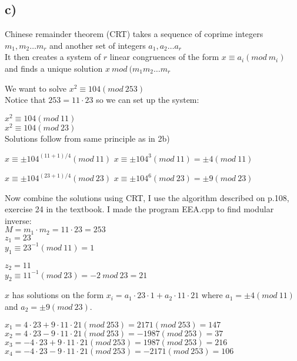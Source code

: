 \documentclass{article}
\begin{document}
\subsection*{c)}

Chinese remainder theorem (CRT) takes a sequence of coprime integers $m_{1}, m_{2} \ldots m_{r}$ and another set of integers $a_{1}, a_{2} \ldots a_{r}$\\
It then creates a system of $r$ linear congruences of the form $x \equiv a_{i} (mod \: m_{i})$ and finds a unique solution $x \: mod \: (m_{1}m_{2}\ldots m_{r}$

We want to solve $x^{2} \equiv 104 (mod \: 253)$\\
Notice that $253 = 11 \cdotp 23$ so we can set up the system:

$x^{2} \equiv 104 (mod \: 11)$\\
$x^{2} \equiv 104 (mod \: 23)$\\
Solutions follow from same principle as in 2b)

$x \equiv \pm 104^{(11+1)/4} (mod \: 11)$
$x \equiv \pm 104^{3} (mod \: 11) = \pm 4 (mod \: 11)$

$x \equiv \pm 104^{(23+1)/4} (mod \: 23)$
$x \equiv \pm 104^{6} (mod \: 23) = \pm 9 (mod \: 23)$

Now combine the solutions using CRT, I use the algorithm described on p.108, exercise 24 in the textbook. I made the program EEA.cpp to find modular inverse:\\
$M = m_{1} \cdotp m_{2} = 11 \cdotp 23 = 253$\\
$z_{1} = 23$\\
$y_{1} \equiv  23^{-1} (mod \: 11) = 1$

$z_{2} = 11$\\
$y_{2} \equiv 11^{-1} (mod \: 23) = -2 \: mod \: 23 = 21$

$x$ has solutions on the form $x_{i} = a_{1} \cdotp 23 \cdotp 1 + a_{2} \cdotp 11 \cdotp 21$ where $a_{1} = \pm 4 (mod \: 11)$ and $a_{2} = \pm 9 (mod \: 23)$.

$x_{1} = 4 \cdotp 23 + 9 \cdotp 11 \cdotp 21 (mod \: 253) = 2171 (mod \: 253) = 147$\\
$x_{2} = 4 \cdotp 23 - 9 \cdotp 11 \cdotp 21 (mod \: 253) = -1987 (mod \: 253) = 37$\\
$x_{3} = -4 \cdotp 23 + 9 \cdotp 11 \cdotp 21 (mod \: 253) = 1987 (mod \: 253) = 216$\\
$x_{4} = -4 \cdotp 23 - 9 \cdotp 11 \cdotp 21 (mod \: 253) = -2171 (mod \: 253) = 106$\\
\end{document}
